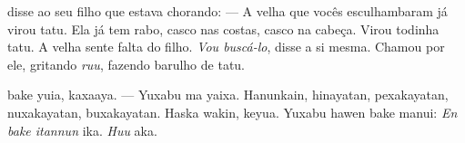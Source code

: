 
 disse ao seu
filho que estava chorando:
--- A velha que vocês esculhambaram
já virou tatu. Ela já tem rabo, casco
nas costas, casco na cabeça. Virou
todinha tatu. A velha sente falta
do filho. \textit{Vou buscá-lo}, disse a
si mesma. Chamou por ele, gritando
\textit{ruu}, fazendo barulho de tatu.

\vspace{2em}

 bake yuia, kaxaaya.
--- Yuxabu ma yaixa. Hanunkain, hinayatan,
pexakayatan, nuxakayatan, buxakayatan.
Haska wakin, keyua. Yuxabu hawen bake
manui: \emph{En bake itannun} ika. \emph{Huu} aka.

\vspace*{\fill}

